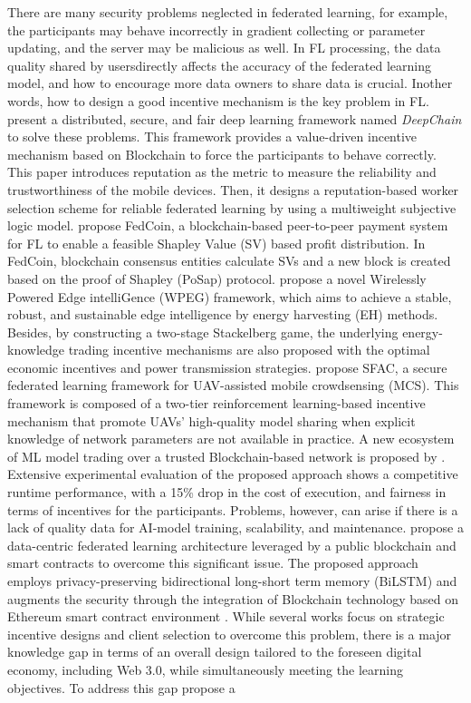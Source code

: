 \documentclass{article}
\begin{document}
There are many security problems neglected in federated learning, for example, the participants may behave incorrectly in gradient collecting or parameter updating, and the server may be malicious as well. In FL processing, the data quality shared by usersdirectly aﬀects the accuracy of the federated learning model, and how to encourage more data owners to share data is crucial. Inother words, how to design a good incentive mechanism is the key problem in FL. 
\newline \newline \cite{weng_2019} present a distributed, secure, and fair deep learning framework named \textit{DeepChain} to solve these problems. This framework provides a value-driven incentive mechanism based on Blockchain to force the participants to behave correctly. This paper \cite{kang_2019} introduces reputation as the metric to measure the reliability and trustworthiness of the mobile devices. Then, it designs a reputation-based worker selection scheme for reliable federated learning by using a multiweight subjective logic model. \cite{liu_fedcoin_2020} propose FedCoin, a blockchain-based peer-to-peer payment system for FL to enable a feasible Shapley Value (SV) based profit distribution. In FedCoin, blockchain consensus entities calculate SVs and a new block is created based on the proof of Shapley (PoSap) protocol. \cite{lin_2022} propose a novel Wirelessly Powered Edge intelliGence (WPEG) framework, which aims to achieve a stable, robust, and sustainable edge intelligence by energy harvesting (EH) methods. Besides, by constructing a two-stage Stackelberg game, the underlying energy-knowledge trading incentive mechanisms are also proposed with the optimal economic incentives and power transmission strategies. \cite{wang_2020} propose SFAC, a secure federated learning framework for UAV-assisted mobile crowdsensing (MCS).  This framework is composed of a two-tier reinforcement learning-based incentive mechanism that promote UAVs’ high-quality model sharing when explicit knowledge of network parameters are not available in practice. A new ecosystem of ML model trading over a trusted Blockchain-based network is proposed by \cite{nguyen_2021}. Extensive experimental evaluation of the proposed approach shows a competitive runtime performance, with a 15\% drop in the cost of execution, and fairness in terms of incentives for the participants. Problems, however, can arise if there is a lack of quality data for AI-model training, scalability, and maintenance. \cite{chaabene_2022} propose a data-centric federated learning architecture leveraged by a public blockchain and smart contracts to overcome this significant issue. The proposed approach employs privacy-preserving bidirectional long-short term memory (BiLSTM) and augments the security through the integration of Blockchain technology based on Ethereum smart contract environment \cite{rahmadika_2022}. While several works focus on strategic incentive designs and client selection to overcome this problem, there is a major knowledge gap in terms of an overall design tailored to the foreseen digital economy, including Web 3.0, while simultaneously meeting the learning objectives. To address this gap \cite{pandey_2022} propose a 
\end{document}

